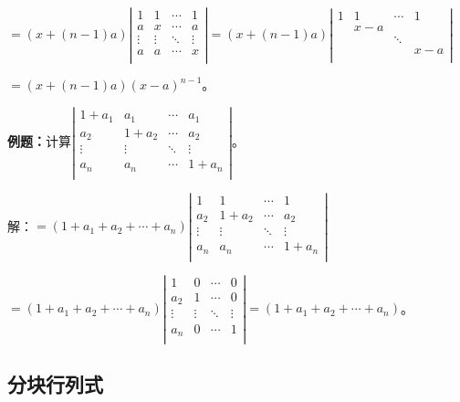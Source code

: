 $=(x+(n-1)a)\left|\begin{array}{cccc} 
    1 & 1 & \cdots & 1 \\
    a & x & \cdots & a \\
    \vdots & \vdots & \ddots & \vdots \\
    a & a & \cdots & x \\
\end{array}\right|=(x+(n-1)a)\left|\begin{array}{cccc} 
    1 & 1 & \cdots & 1 \\
     & x-a & &  \\
     & & \ddots & \\
     & & & x-a \\
\end{array}\right|$

$=(x+(n-1)a)(x-a)^{n-1}$。

\textbf{例题：}计算$\left|\begin{array}{cccc} 
    1+a_1 & a_1 & \cdots & a_1 \\
    a_2 & 1+a_2 & \cdots & a_2 \\
    \vdots & \vdots & \ddots & \vdots \\
    a_n & a_n & \cdots & 1+a_n \\
\end{array}\right|$。

解：$=(1+a_1+a_2+\cdots+a_n)\left|\begin{array}{cccc} 
    1 & 1 & \cdots & 1 \\
    a_2 & 1+a_2 & \cdots & a_2 \\
    \vdots & \vdots & \ddots & \vdots \\
    a_n & a_n & \cdots & 1+a_n \\
\end{array}\right|$

$=(1+a_1+a_2+\cdots+a_n)\left|\begin{array}{cccc} 
    1 & 0 & \cdots & 0 \\
    a_2 & 1 & \cdots & 0 \\
    \vdots & \vdots & \ddots & \vdots \\
    a_n & 0 & \cdots & 1 \\
\end{array}\right|=(1+a_1+a_2+\cdots+a_n)$。

\subsection{分块行列式}

